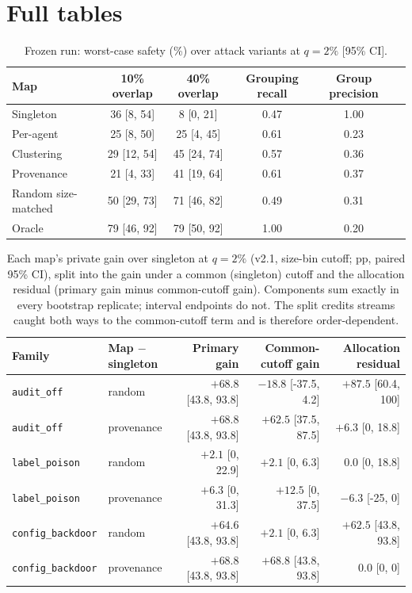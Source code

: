 \documentclass[10pt]{article}
\newcommand{\ci}[2]{[#1, #2]}
\begin{document}
\section{Full tables}
\begin{table}[h]
\centering\small
\caption{Frozen run: worst-case safety (\%) over attack variants at $q=2\%$ [95\% CI].}
\label{tab:frozen}
\begin{tabular}{@{}lccccc@{}}
\toprule
\textbf{Map} & \textbf{10\% overlap} & \textbf{40\% overlap} & \textbf{Grouping recall} & \textbf{Group precision} \\
\midrule
Singleton & 36 \ci{8}{54} & 8 \ci{0}{21} & 0.47 & 1.00 \\
Per-agent & 25 \ci{8}{50} & 25 \ci{4}{45} & 0.61 & 0.23 \\
Clustering & 29 \ci{12}{54} & 45 \ci{24}{74} & 0.57 & 0.36 \\
Provenance & 21 \ci{4}{33} & 41 \ci{19}{64} & 0.61 & 0.37 \\
Random size-matched & 50 \ci{29}{73} & 71 \ci{46}{82} & 0.49 & 0.31 \\
Oracle & 79 \ci{46}{92} & 79 \ci{50}{92} & 1.00 & 0.20 \\
\bottomrule
\end{tabular}
\end{table}

\begin{table}[h]
\centering\small
\caption{Each map's private gain over singleton at $q=2\%$ (v2.1, size-bin cutoff; pp, paired 95\% CI), split into the gain under a common (singleton) cutoff and the allocation residual (primary gain minus common-cutoff gain). Components sum exactly in every bootstrap replicate; interval endpoints do not. The split credits streams caught both ways to the common-cutoff term and is therefore order-dependent.}
\label{tab:decomp}
\begin{tabular}{@{}llrrr@{}}
\toprule
\textbf{Family} & \textbf{Map $-$ singleton} & \textbf{Primary gain} & \textbf{Common-cutoff gain} & \textbf{Allocation residual} \\
\midrule
\texttt{audit\_off} & random & $+68.8$ \ci{43.8}{93.8} & $-18.8$ \ci{-37.5}{4.2} & $+87.5$ \ci{60.4}{100} \\
\texttt{audit\_off} & provenance & $+68.8$ \ci{43.8}{93.8} & $+62.5$ \ci{37.5}{87.5} & $+6.3$ \ci{0}{18.8} \\
\texttt{label\_poison} & random & $+2.1$ \ci{0}{22.9} & $+2.1$ \ci{0}{6.3} & $0.0$ \ci{0}{18.8} \\
\texttt{label\_poison} & provenance & $+6.3$ \ci{0}{31.3} & $+12.5$ \ci{0}{37.5} & $-6.3$ \ci{-25}{0} \\
\texttt{config\_backdoor} & random & $+64.6$ \ci{43.8}{93.8} & $+2.1$ \ci{0}{6.3} & $+62.5$ \ci{43.8}{93.8} \\
\texttt{config\_backdoor} & provenance & $+68.8$ \ci{43.8}{93.8} & $+68.8$ \ci{43.8}{93.8} & $0.0$ \ci{0}{0} \\
\bottomrule
\end{tabular}
\end{table}
\end{document}
